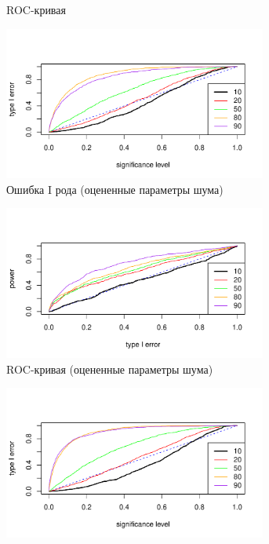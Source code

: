 \documentclass[specialist,
substylefile = spbu_report.rtx,
subf,href,colorlinks=true, 12pt]{disser}
\theoremstyle{definition}
\begin{document}
\begin{figure}[h!]
\begin{subfigure}[t]{0.5\textwidth}
		\caption{ROC-кривая}
		\label{fig:trend_roc}
	\end{subfigure}
	\begin{subfigure}[t]{0.5\textwidth}
		\centering
		\includegraphics[width=0.95\textwidth]{img/type1error_trend_est_noise.pdf}
		\caption{Ошибка I рода (оцененные параметры шума)}
		\label{fig:trend_est_noise_type1error}
	\end{subfigure}\hspace{\fill}
	\begin{subfigure}[t]{0.5\textwidth}
		\centering
		\includegraphics[width=0.95\textwidth]{img/roc_trend_est_noise.pdf}
		\caption{ROC-кривая (оцененные параметры шума)}
		\label{fig:trend_est_noise_roc}
	\end{subfigure}
	\begin{subfigure}[t]{0.5\textwidth}
		\centering
		\includegraphics[width=0.95\textwidth]{img/type1error_trend_est_noise_signal.pdf}

\end{subfigure}
\end{figure}
\end{document}
